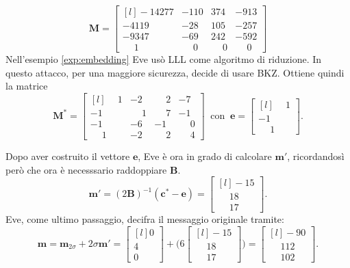 \begin{exmp}
\begin{equation*}
    \mathbf{M} =
    \begin{bmatrix*}[l]
        -14277 & -110 & 374 & -913\\
        -4119 & -28 & 105 & -257\\
        -9347 & -69 & 242 & -592 \\
        \phantom{-}1 & \phantom{-}0 & \phantom{-}0 & \phantom{-}0
    \end{bmatrix*}
\end{equation*}
Nell'esempio \ref{exp:embedding} Eve usò LLL come algoritmo di riduzione. In questo attacco,
per una maggiore sicurezza, decide di usare BKZ. Ottiene quindi la matrice
\begin{equation*}
    \mathbf{M}^* =
    \begin{bmatrix*}[l]
        \phantom{-}1 & -2 & \phantom{-}2 & -7\\
        -1 & \phantom{-}1 &  \phantom{-}7& -1\\
        -1 & -6 & -1 &\phantom{-}0 \\
        \phantom{-}1 & -2 & \phantom{-}2 & \phantom{-}4
    \end{bmatrix*}
    \ \text{ con } \
    \mathbf{e} =
    \begin{bmatrix*}[l]
        \phantom{-}1 \\
                  -1 \\
        \phantom{-}1
    \end{bmatrix*}.
\end{equation*}

Dopo aver costruito il vettore $\mathbf{e}$, Eve è ora in grado di calcolare $\mathbf{m}'$,
ricordandosì però che ora è necesssario raddoppiare $\mathbf{B}$. 
\begin{equation*}
    \mathbf{m}' = (2\mathbf{B})^{-1} (\mathbf{c}^* - \mathbf{e}) =
    \begin{bmatrix*}[l]
        -15\\
        \phantom{-}18\\
        \phantom{-}17
    \end{bmatrix*}.
\end{equation*}
Eve, come ultimo passaggio, decifra il messaggio originale tramite:
\[
    \mathbf{m} = \mathbf{m}_{2\sigma} + 2\sigma\mathbf{m}' =
    \begin{bmatrix*}[l]
        0\\
        4\\
        0
    \end{bmatrix*} + 
    \Biggl(
        6
        \begin{bmatrix*}[l]
            -15\\
            \phantom{-}18\\
            \phantom{-}17
        \end{bmatrix*}
    \Biggl)
    =
    \begin{bmatrix*}[l]
        -90\\
        \phantom{-}112\\
        \phantom{-}102
    \end{bmatrix*}.
\]
\end{exmp}
